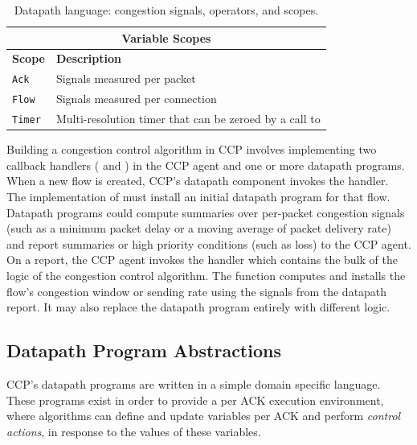 \begin{table}
\begin{tabular}{@{} p{}p{}}
        \multicolumn{2}{c}{Variable Scopes} \\
        \hline
        \hline
        \textbf{Scope} & \textbf{Description} \\
        \texttt{Ack} & Signals measured per packet \\
        \texttt{Flow} & Signals measured per connection \\
        \texttt{Timer} & Multi-resolution timer that can be zeroed by a call to \ct{reset} \\
    \end{tabular}
    \caption{Datapath language: congestion signals, operators, and scopes.}\label{tab:api}
\end{table}

Building a congestion control algorithm in CCP involves
implementing two callback handlers ( and ) in the CCP agent
and one or more datapath programs.
When a new flow is created, CCP's datapath component invokes the  handler.
The implementation of  must install an initial datapath program for that flow.
%
Datapath programs could compute summaries over per-packet
congestion signals (such as a minimum packet delay or a moving average of packet
delivery rate) and report summaries or high priority conditions
(such as loss) to the CCP agent.
On a report, the CCP agent invokes the  handler
which contains the bulk of the logic of the congestion control algorithm.
The  function computes and installs the flow's congestion
window or sending rate using the signals from the datapath report.
It may also replace the datapath program entirely with different logic.

\subsection{Datapath Program Abstractions}
\label{s:ccp:datapath_programs}
CCP's datapath programs are written in a simple domain specific language.
These programs exist in order to provide a per ACK execution environment, where algorithms can define and update variables per ACK and perform \textit{control actions}, in response to the values of these variables.

